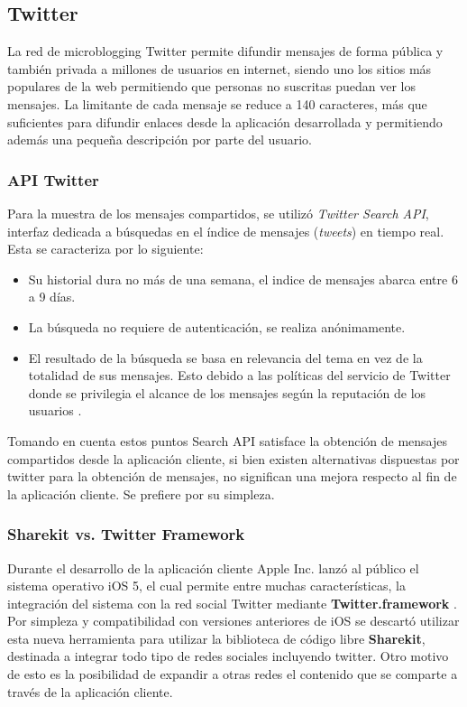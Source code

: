 	\subsection{Twitter}
	La red de microblogging Twitter permite difundir mensajes de forma pública y también privada a millones de usuarios en internet, siendo uno los sitios más populares de la web\cite{alexa-twitter} permitiendo que personas no suscritas puedan ver los mensajes.
	La limitante de cada mensaje se reduce a 140 caracteres, más que suficientes para difundir enlaces desde la aplicación desarrollada y permitiendo además una pequeña descripción por parte del usuario.
		\subsubsection{API Twitter}
		Para la muestra de los mensajes compartidos, se utilizó \textit{Twitter Search API}, interfaz dedicada a búsquedas en el índice de mensajes (\textit{tweets}) en tiempo real. Esta se caracteriza por lo siguiente:
		
		\begin{itemize}
		\item Su historial dura no más de una semana, el indice de mensajes abarca entre 6 a 9 días.
		\item La búsqueda no requiere de autenticación, se realiza anónimamente.
		\item El resultado de la búsqueda se basa en relevancia del tema en vez de la totalidad de sus mensajes. Esto debido a las políticas del servicio de Twitter donde se privilegia el alcance de los mensajes según la reputación de los usuarios \cite{twitter-relevance}.
		\end{itemize}

Tomando en cuenta estos puntos Search API satisface la obtención de mensajes compartidos desde la aplicación cliente, si bien existen alternativas dispuestas por twitter para la obtención de mensajes, no significan una mejora respecto al fin de la aplicación cliente. Se prefiere por su simpleza.
		
		\subsubsection{Sharekit vs. Twitter Framework}
Durante el desarrollo de la aplicación cliente Apple Inc. lanzó al público el sistema operativo iOS 5, el cual permite entre muchas características, la integración del sistema con la red social Twitter mediante \textbf{Twitter.framework} . Por simpleza y compatibilidad con versiones anteriores de iOS se descartó utilizar esta nueva herramienta para utilizar la biblioteca de código libre \textbf{Sharekit}\cite{library-sharekit}, destinada a integrar todo tipo de redes sociales incluyendo twitter. Otro motivo de esto es la posibilidad de expandir a otras redes el contenido que se comparte a través de la aplicación cliente. \\

